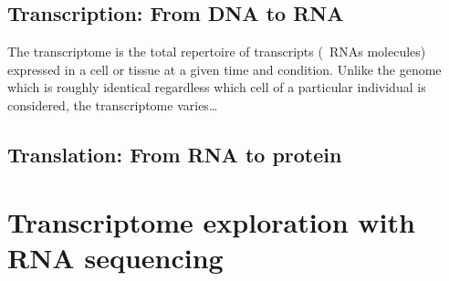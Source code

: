 

\subsection{Transcription: From \gls{DNA} to \gls{RNA}}
\begin{comment}
Transcriptome is the complete population of \gls{RNA} in a cell or a group of
cells. There are many kinds of them:
\begin{itemize}
    \item \gls{ncRNA}
    \item \gls{tRNA}
    \item \gls{miRNA}
    \item \gls{snRNA}
    \item \gls{scaRNA}
    \item \gls{snoRNA}
    \item \gls{scRNA}
\end{itemize}
\end{comment}

The transcriptome is the total repertoire of transcripts (\ie\ \glspl{RNA}
molecules) expressed in a cell or tissue at a given time and condition. Unlike
the genome which is roughly identical regardless which cell of a particular
individual is considered, the transcriptome varies\ldots

\subsection{Translation: From \gls{RNA} to protein}


\section{Transcriptome exploration with RNA sequencing}


\begin{comment}
Biological research uses mainly two approaches to
study the cell life intricacy and its underlying mechanisms.\\
The oldest approach is descriptive:


Small bits: corrections for Rnaseq are already part of the analysis and
requires often as much flair than skills.
Contrarily to \Dnaseq\ where corrections can be applied \TK{add reference} and
then the analysis be done, in Rnaseq each analysis requires a set of conform
quantification and normalisation methods.
While, there are quite established protocols for differential expression analysis,
there are presently many other downstream analyses that are cumbersome
and/or not settled yet. This is the case for this study.
\end{comment}

